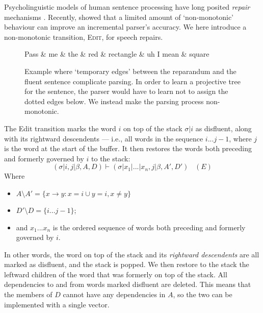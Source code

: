 \documentclass[11pt,letterpaper]{article}
\begin{document}
Psycholinguistic models of human sentence processing have long posited
\emph{repair} mechanisms \citep{FrazierRayner1982}.  Recently, \citet{honnibal:13}
showed that a limited amount of `non-monotonic' behaviour can 
improve an incremental parser's accuracy.
We here introduce a non-monotonic transition, \textsc{Edit}, for speech
repairs. 

\begin{figure}
    \small
\begin{dependency}[theme=simple, segmented edge]
    \begin{deptext}[column sep=.075cm, row sep=.1ex]
    Pass \& me \& the \& red \& rectangle \& uh I mean \& square \\
    \end{deptext}
    \end{dependency}
    \caption{\small Example where `temporary edges' between the reparandum and the
    fluent sentence complicate parsing. In order to learn a projective tree
    for the sentence, the parser would have to learn not to assign the dotted
    edges below. We instead make the parsing process non-monotonic.
\label{fig:rectangle}}
\end{figure}


The Edit transition marks the word $i$ on top of the stack $\sigma | i$ as
disfluent, along with its rightward descendents --- i.e., all words in the
sequence $i...j-1$, where $j$ is the word at the start of the buffer. It then
restores the words both preceding and formerly governed by $i$ to the stack:
\begin{equation}
    (\sigma | i, j | \beta, A, D) \vdash (\sigma | x_1 | ... | x_n, j | \beta,A',D')\;\;\;(E)
    \nonumber
\end{equation}
Where 
\begin{itemize}
    \itemsep0em
    \item $A \setminus A' = \{x \rightarrow y : x = i \cup y = i, x \ne y \}$
    \item $D' \setminus D = \{i...j-1\}$;
\item  and $x_1...x_n$ is the ordered sequence of words both preceding and formerly governed
by $i$.
\end{itemize}
In other words, the word on top of the stack and its \emph{rightward descendents}
are all marked as disfluent, and the stack is popped. We then restore to the stack
the leftward children of the word that was formerly on top of the
stack. All dependencies to and from words marked disfluent are deleted. 
This means that the members of $D$ cannot have any dependencies in $A$, so the
two can be implemented with a single vector.
\end{document}
